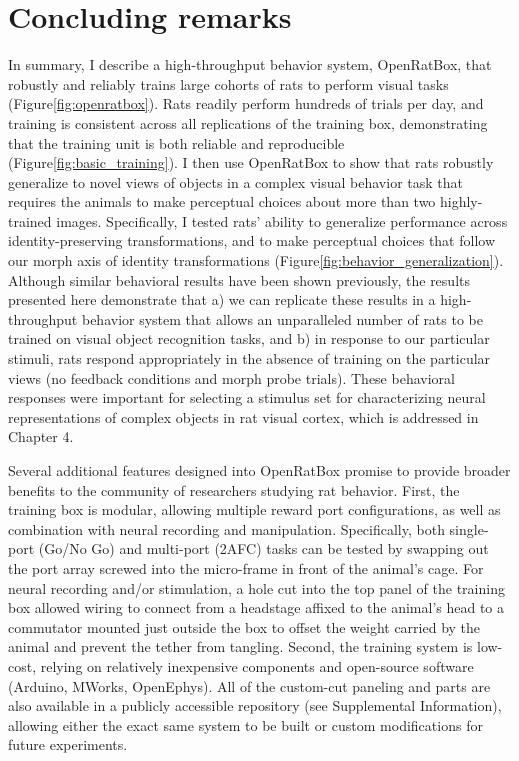 \section{Concluding remarks}
In summary, I describe a high-throughput behavior system, OpenRatBox, that robustly and reliably trains large cohorts of rats to perform visual tasks (Figure\ref{fig:openratbox}). Rats readily perform hundreds of trials per day, and training is consistent across all replications of the training box, demonstrating that the training unit is both reliable and reproducible (Figure\ref{fig:basic_training}). I then use OpenRatBox to show that rats robustly generalize to novel views of objects in a complex visual behavior task that requires the animals to make perceptual choices about more than two highly-trained images. Specifically, I tested rats' ability to generalize performance across identity-preserving transformations, and to make perceptual choices that follow our morph axis of identity transformations (Figure\ref{fig:behavior_generalization}). Although similar behavioral results have been shown previously\cite{Zoccolan2009, Tafazoli2012, Vermaercke2012}, the results presented here demonstrate that a) we can replicate these results in a high-throughput behavior system that allows an unparalleled number of rats to be trained on visual object recognition tasks, and b) in response to our particular stimuli, rats respond appropriately in the absence of training on the particular views (no feedback conditions and morph probe trials). These behavioral responses were important for selecting a stimulus set for characterizing neural representations of complex objects in rat visual cortex, which is addressed in Chapter 4. 

Several additional features designed into OpenRatBox promise to provide broader benefits to the community of researchers studying rat behavior. First, the training box is modular, allowing multiple reward port configurations, as well as combination with neural recording and manipulation. Specifically, both single-port (Go/No Go) and multi-port (2AFC) tasks can be tested by swapping out the port array screwed into the micro-frame in front of the animal's cage. For neural recording and/or stimulation, a hole cut into the top panel of the training box allowed wiring to connect from a headstage affixed to the animal's head to a commutator mounted just outside the box to offset the weight carried by the animal and prevent the tether from tangling. Second, the training system is low-cost, relying on relatively inexpensive components and open-source software (Arduino, MWorks, OpenEphys). All of the custom-cut paneling and parts are also available in a publicly accessible repository (see Supplemental Information), allowing either the exact same system to be built or custom modifications for future experiments. 

